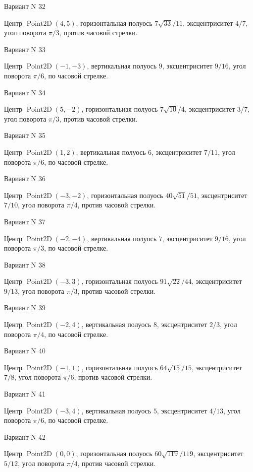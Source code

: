 \documentclass[11pt]{report}
\begin{document}
Вариант N 32

Центр $\operatorname{Point2D}\left(4, 5\right)$, горизонтальная полуось $7 \sqrt{33} / 11$, эксцентриситет $4 / 7$, угол поворота $\pi / 3$, против часовой стрелки.

Вариант N 33

Центр $\operatorname{Point2D}\left(-1, -3\right)$, вертикальная полуось $9$, эксцентриситет $9 / 16$, угол поворота $\pi / 6$, по часовой стрелке.

Вариант N 34

Центр $\operatorname{Point2D}\left(5, -2\right)$, горизонтальная полуось $7 \sqrt{10} / 4$, эксцентриситет $3 / 7$, угол поворота $\pi / 3$, против часовой стрелки.

Вариант N 35

Центр $\operatorname{Point2D}\left(1, 2\right)$, вертикальная полуось $6$, эксцентриситет $7 / 11$, угол поворота $\pi / 6$, по часовой стрелке.

Вариант N 36

Центр $\operatorname{Point2D}\left(-3, -2\right)$, горизонтальная полуось $40 \sqrt{51} / 51$, эксцентриситет $7 / 10$, угол поворота $\pi / 4$, против часовой стрелки.

Вариант N 37

Центр $\operatorname{Point2D}\left(-2, -4\right)$, вертикальная полуось $7$, эксцентриситет $9 / 16$, угол поворота $\pi / 3$, по часовой стрелке.

Вариант N 38

Центр $\operatorname{Point2D}\left(-3, 3\right)$, горизонтальная полуось $91 \sqrt{22} / 44$, эксцентриситет $9 / 13$, угол поворота $\pi / 3$, против часовой стрелки.

Вариант N 39

Центр $\operatorname{Point2D}\left(-2, 4\right)$, вертикальная полуось $8$, эксцентриситет $2 / 3$, угол поворота $\pi / 4$, по часовой стрелке.

Вариант N 40

Центр $\operatorname{Point2D}\left(-1, 1\right)$, горизонтальная полуось $64 \sqrt{15} / 15$, эксцентриситет $7 / 8$, угол поворота $\pi / 6$, против часовой стрелки.

Вариант N 41

Центр $\operatorname{Point2D}\left(-3, 4\right)$, вертикальная полуось $5$, эксцентриситет $4 / 13$, угол поворота $\pi / 6$, по часовой стрелке.

Вариант N 42

Центр $\operatorname{Point2D}\left(0, 0\right)$, горизонтальная полуось $60 \sqrt{119} / 119$, эксцентриситет $5 / 12$, угол поворота $\pi / 4$, против часовой стрелки.
\end{document}
